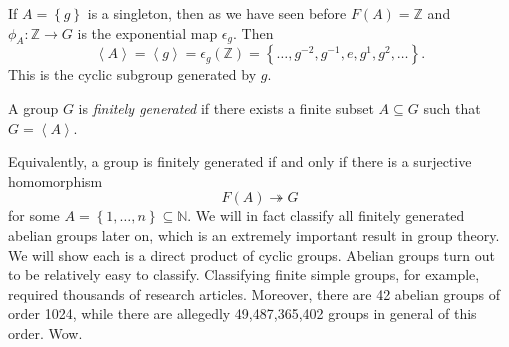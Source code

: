 If $A=\left\{ g \right\} $ is a singleton, then as we have seen before $F(A)=\mathbb{Z}$ and $\phi_A : \mathbb{Z} \to G$ is the exponential map $\epsilon_g$. Then
\[
	\left\langle A \right\rangle =\left\langle g \right\rangle = \epsilon_g(\mathbb{Z})=\left\{ \ldots,g^{-2},g^{-1},e,g^{1},g^{2},\ldots \right\} 
.\]
This is the cyclic subgroup generated by $g$.
\begin{definition}\label{dfn:2.6.4}
	A group $G$ is \emph{finitely generated} if there exists a finite subset $A\subseteq G$ such that $G=\left\langle A \right\rangle $.
\end{definition}
Equivalently, a group is finitely generated if and only if there is a surjective homomorphism
\[
	F(A)\twoheadrightarrow G
\]
for some $A=\left\{ 1, \ldots, n \right\} \subseteq \mathbb{N}$. We will in fact classify all finitely generated abelian groups later on, which is an extremely important result in group theory. We will show each is a direct product of cyclic groups. Abelian groups turn out to be relatively easy to classify. Classifying finite simple groups, for example, required thousands of research articles. Moreover, there are 42 abelian groups of order 1024, while there are allegedly 49,487,365,402 groups in general of this order. Wow.

